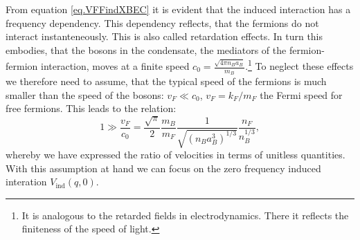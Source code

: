From equation \eqref{eq.VFFindXBEC} it is evident that the induced interaction has a frequency dependency. This dependency reflects, that the fermions do not interact instanteneously. This is also called retardation effects. In turn this embodies, that the bosons in the condensate, the mediators of the fermion-fermion interaction, moves at a finite speed $c_0 = \frac{\sqrt{4\pi n_B a_B}}{m_B}$.\footnote{It is analogous to the retarded fields in electrodynamics. There it reflects the finiteness of the speed of light.} To neglect these effects we therefore need to assume, that the typical speed of the fermions is much smaller than the speed of the bosons: $v_F \ll c_0$, $v_F = k_F/m_F$ the Fermi speed for free fermions. This leads to the relation:
\begin{equation}
1 \gg \frac{v_F}{c_0} = \frac{\sqrt{\pi}}{2} \frac{m_B}{m_F}\frac{1}{ \sqrt{ (n_Ba_B^3)^{1/3} } }\frac{n_F}{ n_B^{1/3} }, 
\label{eq.RetardationEffectsneglectionassumption}
\end{equation}
whereby we have expressed the ratio of velocities in terms of unitless quantities. With this assumption at hand we can focus on the zero frequency induced interation $V_{\text{ind}}(q,0)$. 

